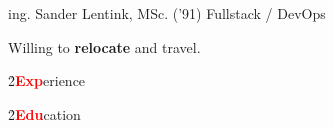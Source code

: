 \large ing.
\Huge Sander Lentink,
\large MSc. ('91) Fullstack / DevOps
\normalsize

Willing to \textbf{relocate} and travel.

\h{2}{\textbf{\textcolor{red}{Exp}}erience}{}


\h{2}{\textbf{\textcolor{red}{Edu}}cation}{}


